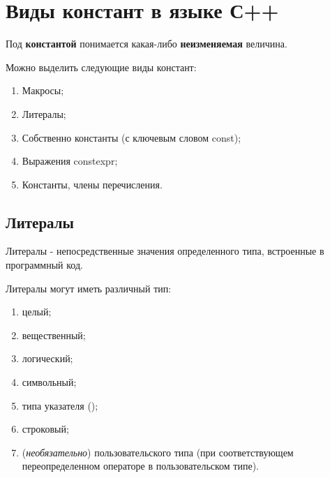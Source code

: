 \section{Виды констант в языке С++}

Под \textbf{константой} понимается какая-либо \textbf{неизменяемая}
величина.

Можно выделить следующие виды констант:
\begin{enumerate}
  \item Макросы;
  \item Литералы;
  \item Собственно константы (с ключевым словом const);
  \item Выражения constexpr;
  \item Константы, члены перечисления.
\end{enumerate}

\subsection{Литералы}

Литералы - непосредственные значения определенного типа, встроенные в
программный код.

Литералы могут иметь различный тип:
\begin{enumerate}
  \item целый;
  \item вещественный;
  \item логический;
  \item символьный;
  \item типа указателя ();
  \item строковый;
  \item (\emph{необязательно}) пользовательского типа (при
    соответствующем переопределенном операторе в пользовательском типе).
\end{enumerate}

